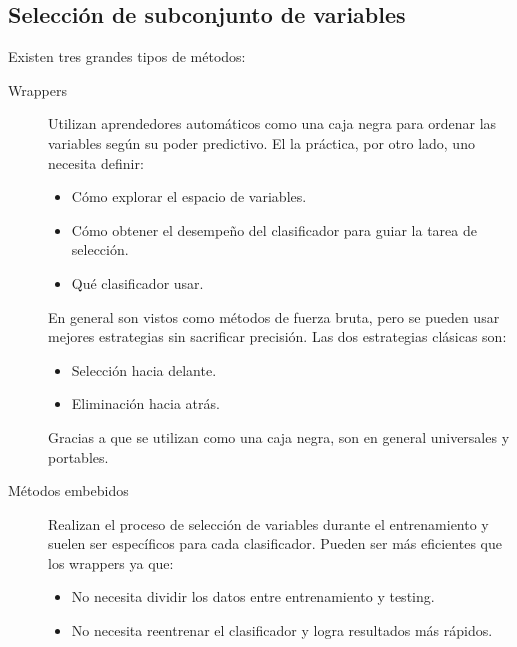 \documentclass[11pt,spanish]{article}
\begin{document}
\subsection{Selección de subconjunto de variables}
Existen tres grandes tipos de métodos:
\begin{description}
    \item[Wrappers] Utilizan aprendedores automáticos como una caja negra para
    ordenar las variables según su poder predictivo. El la práctica, por otro
    lado, uno necesita definir:
    \begin{itemize}
        \item Cómo explorar el espacio de variables.
        \item Cómo obtener el desempeño del clasificador para guiar la tarea de
        selección.
        \item Qué clasificador usar.
    \end{itemize}
    En general son vistos como métodos de fuerza bruta, pero se pueden usar
    mejores estrategias sin sacrificar precisión. Las dos estrategias clásicas
    son:
    \begin{itemize}
        \item Selección hacia delante.
        \item Eliminación hacia atrás.
    \end{itemize}
    Gracias a que se utilizan como una caja negra, son en general universales 
    y portables.

    \item[Métodos embebidos] Realizan el proceso de selección de variables
    durante el entrenamiento y suelen ser específicos para cada clasificador.
    Pueden ser más eficientes que los wrappers ya que:
    \begin{itemize}
        \item No necesita dividir los datos entre entrenamiento y testing.
        \item No necesita reentrenar el clasificador y logra resultados más
        rápidos.
    \end{itemize}


\end{description}
\end{document}

